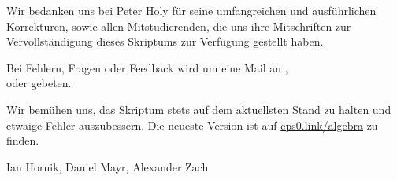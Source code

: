 
Wir bedanken uns bei Peter Holy für seine umfangreichen und ausführlichen Korrekturen, sowie allen Mitstudierenden, die uns ihre Mitschriften zur Vervollständigung dieses Skriptums zur Verfügung gestellt haben.

Bei Fehlern, Fragen oder Feedback wird um eine Mail an , \\  oder  gebeten.

Wir bemühen uns, das Skriptum stets auf dem aktuellsten Stand zu halten und etwaige Fehler auszubessern. Die neueste Version ist auf \href{https://eps0.link/algebra}{\ttfamily eps0.link/algebra} zu finden.

\begin{flushright}
    Ian Hornik, Daniel Mayr, Alexander Zach
\end{flushright}
